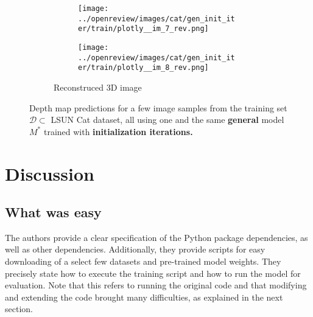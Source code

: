 \begin{figure}[!htb]
\begin{subfigure}{\textwidth}
\begin{subfigure}{0.24\textwidth}
    \centering
    \texttt{[image: ../openreview/images/cat/gen\_init\_iter/train/plotly\_\_im\_7\_rev.png]}
\end{subfigure}
\begin{subfigure}{0.24\textwidth}
    \centering
    \texttt{[image: ../openreview/images/cat/gen\_init\_iter/train/plotly\_\_im\_8\_rev.png]}
\end{subfigure}
\caption{Reconstruced 3D image}
\end{subfigure}
    \caption{Depth map predictions for a few image samples from the training set $\mathcal{D} \subset$ LSUN Cat dataset, all using one and the same \textbf{general} model $M^*$ trained with \textbf{initialization iterations.}}
    \label{fig:init_iter_general}
\end{figure}
\section{Discussion}


\subsection{What was easy}

The authors provide a clear specification of the Python package dependencies, as well as other dependencies. Additionally, they provide scripts for easy downloading of a select few datasets and pre-trained model weights. They precisely state how to execute the training script and how to run the model for evaluation. Note that this refers to running the original code and that modifying and extending the code brought many difficulties, as explained in the next section.


